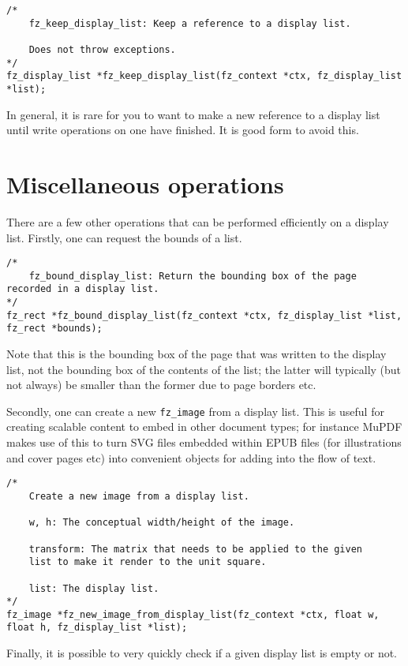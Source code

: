 \documentclass[oneside]{book}
\begin{document}
\begin{lstlisting}
/*
	fz_keep_display_list: Keep a reference to a display list.

	Does not throw exceptions.
*/
fz_display_list *fz_keep_display_list(fz_context *ctx, fz_display_list *list);
\end{lstlisting}

In general, it is rare for you to want to make a new reference to a display list until write operations on one have finished. It is good form to avoid this.

\section{Miscellaneous operations}

There are a few other operations that can be performed efficiently on a display list. Firstly, one can request the bounds of a list.

\begin{lstlisting}
/*
	fz_bound_display_list: Return the bounding box of the page recorded in a display list.
*/
fz_rect *fz_bound_display_list(fz_context *ctx, fz_display_list *list, fz_rect *bounds);
\end{lstlisting}

Note that this is the bounding box of the page that was written to the display list, not the bounding box of the contents of the list; the latter will typically (but not always) be smaller than the former due to page borders etc.

Secondly, one can create a new \texttt{fz\_image} from a display list. This is useful for creating scalable content to embed in other document types; for instance MuPDF makes use of this to turn SVG files embedded within EPUB files (for illustrations and cover pages etc) into convenient objects for adding into the flow of text.

\begin{lstlisting}
/*
	Create a new image from a display list.

	w, h: The conceptual width/height of the image.

	transform: The matrix that needs to be applied to the given
	list to make it render to the unit square.

	list: The display list.
*/
fz_image *fz_new_image_from_display_list(fz_context *ctx, float w, float h, fz_display_list *list);
\end{lstlisting}

Finally, it is possible to very quickly check if a given display list is empty or not.
\end{document}
